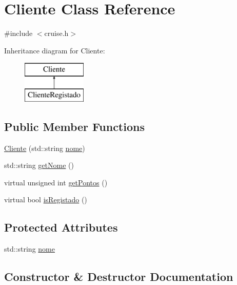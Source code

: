 \hypertarget{classCliente}{}\section{Cliente Class Reference}
\label{classCliente}


{\ttfamily \#include $<$cruise.\+h$>$}

Inheritance diagram for Cliente\+:\begin{figure}[H]
\begin{center}
\leavevmode
\includegraphics[height=2.000000cm]{classCliente}
\end{center}
\end{figure}
\subsection*{Public Member Functions}
\begin{DoxyCompactItemize}
\item 
\hyperlink{classCliente_a17e05e34ce319b738fb68c53e4ded2c3}{Cliente} (std\+::string \hyperlink{classCliente_aaa79b0a26f7d5d007fe4ae9696564ca5}{nome})
\item 
std\+::string \hyperlink{classCliente_a09b99b4140f32bdd3bf486cc2ac5ee27}{get\+Nome} ()
\item 
virtual unsigned int \hyperlink{classCliente_a4bcd51f0d9a0bfe7d9d47074ac4e65de}{get\+Pontos} ()
\item 
virtual bool \hyperlink{classCliente_acb60d8bf04134b986ae56a79db8beaaf}{is\+Registado} ()
\end{DoxyCompactItemize}
\subsection*{Protected Attributes}
\begin{DoxyCompactItemize}
\item 
std\+::string \hyperlink{classCliente_aaa79b0a26f7d5d007fe4ae9696564ca5}{nome}
\end{DoxyCompactItemize}


\subsection{Constructor \& Destructor Documentation}
\mbox{\label{classCliente_a17e05e34ce319b738fb68c53e4ded2c3}} 
